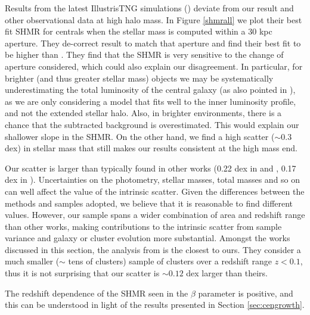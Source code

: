 {Results from the latest IllustrisTNG simulations (\citealt{illustris}) deviate from our result and other observational data at high halo mass. In Figure \ref{shmrall} we plot their best fit SHMR for centrals when the stellar mass is computed within a 30 kpc aperture. They de-correct \citet{kravtsov} result to match that aperture and find their best fit to be higher than \citet{kravtsov}. They find that the SHMR is very sensitive to the change of aperture considered, which could also explain our disagreement. In particular, for brighter (and thus greater stellar mass) objects we may be systematically underestimating the total luminosity of the central galaxy (as also pointed in \citealt{kravtsov}), as we are only considering a model that fits well to the inner luminosity profile, and not the extended stellar halo. Also, in brighter environments, there is a chance that the subtracted background is overestimated. This would explain our shallower slope in the SHMR. On the other hand, we find a high scatter ($\sim 0.3$ dex) in stellar mass that still makes our results consistent at the high mass end.

Our scatter is larger than typically found in other works (0.22 dex in \citealt{zu} and \citealt{coupon}, 0.17 dex in \citealt{kravtsov}). Uncertainties on the photometry, stellar masses, total masses and so on can well affect the value of the intrinsic scatter. Given the differences between the methods and samples adopted, we believe that it is reasonable to find different values. However, our sample spans a wider combination of area and redshift range than other works, making contributions to the intrinsic scatter from sample variance and galaxy or cluster evolution more substantial. Amongst the works discussed in this section, the analysis from \citet{kravtsov} is the closest to ours. They consider a much smaller ($\sim$ tens of clusters) sample of clusters over a redshift range $z<0.1$, thus it is not surprising that our scatter is $\sim 0.12$ dex larger than theirs. 

The redshift dependence of the SHMR seen in the $\beta$ parameter is positive, and this can be understood in light of the results presented in Section \ref{sec:cengrowth}.

}
